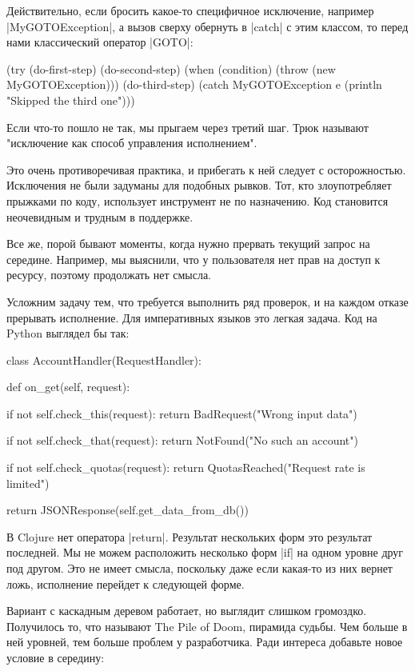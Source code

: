Действительно, если бросить какое-то специфичное исключение, например
\spverb|MyGOTOException|, а вызов сверху обернуть в \spverb|catch| с этим классом, то перед
нами классический оператор \spverb|GOTO|:

\begin{code}
(try
  (do-first-step)
  (do-second-step)
  (when (condition)
    (throw (new MyGOTOException)))
  (do-third-step)
  (catch MyGOTOException e
    (println "Skipped the third one")))
\end{code}

Если что-то пошло не так, мы прыгаем через третий шаг. Трюк называют "исключение
как способ управления исполнением".

Это очень противоречивая практика, и прибегать к ней следует с
осторожностью. Исключения не были задуманы для подобных рывков. Тот, кто
злоупотребляет прыжками по коду, использует инструмент не по назначению. Код
становится неочевидным и трудным в поддержке.

Все же, порой бывают моменты, когда нужно прервать текущий запрос на
середине. Например, мы выяснили, что у пользователя нет прав на доступ к
ресурсу, поэтому продолжать нет смысла.

Усложним задачу тем, что требуется выполнить ряд проверок, и на каждом отказе
прерывать исполнение. Для императивных языков это легкая задача. Код на Python
выглядел бы так:

\begin{code}
class AccountHandler(RequestHandler):

  def on_get(self, request):

    if not self.check_this(request):
      return BadRequest("Wrong input data")

    if not self.check_that(request):
      return NotFound("No such an account")

    if not self.check_quotas(request):
      return QuotasReached("Request rate is limited")

    return JSONResponse(self.get_data_from_db())
\end{code}

В Clojure нет оператора \spverb|return|. Результат нескольких форм это результат
последней. Мы не можем расположить несколько форм \spverb|if| на одном уровне друг под
другом. Это не имеет смысла, поскольку даже если какая-то из них вернет ложь,
исполнение перейдет к следующей форме.

Вариант с каскадным деревом работает, но выглядит слишком громоздко. Получилось
то, что называют The Pile of Doom, пирамида судьбы. Чем больше в ней уровней,
тем больше проблем у разработчика. Ради интереса добавьте новое условие в
середину:

